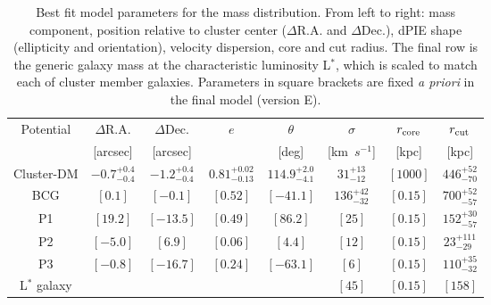 \documentclass[12pt]{article}
\begin{document}
{\begin{table}[ht]
    \centering
    \begin{tabular}{c|c|c|c|c|c|c|c|}
    Potential & $\Delta$R.A. & $\Delta$Dec. & $e$ & $\theta$ & $\sigma$ & $r_{\rm core}$ & $r_{\rm cut}$ \\
    & [arcsec] & [arcsec] & & [deg] & [km\ $s^{-1}$] & [kpc] & [kpc] \\
\hline
Cluster-DM & $ -0.7^{+  0.4}_{ -0.4}$ & $ -1.2^{+  0.4}_{ -0.4}$ & $ 0.81^{+ 0.02}_{-0.13}$ & $114.9^{+  2.0}_{ -4.1}$ & $31^{+13}_{-12}$ & $[1000]$ & $446^{+52}_{-70}$ \\
BCG            & $[  0.1]$ & $[ -0.1]$ & $[0.52]$ & $[-41.1]$ & $136^{+42}_{-32}$ & $[0.15]$ & $700^{+52}_{-57}$ \\
P1             & $[ 19.2]$ & $[-13.5]$ & $[0.49]$ & $[ 86.2]$ & $[25]$            & $[0.15]$ & $152^{+30}_{-57}$ \\
P2             & $[ -5.0]$ & $[  6.9]$ & $[0.06]$ & $[  4.4]$ & $[12]$            & $[0.15]$ & $23^{+111}_{-29}$ \\
P3             & $[ -0.8]$ & $[-16.7]$ & $[0.24]$ & $[-63.1]$ & $[6]$             & $[0.15]$ & $110^{+35}_{-32}$ \\
L$^{*}$ galaxy &           &           &          &           & $[45]$            & $[0.15]$ & $[158]$\\            
\hline
    \end{tabular}
    \caption{Best fit model parameters for the mass distribution. From left to right: mass component, position relative to cluster center ($\Delta$R.A. and $\Delta$Dec.), dPIE shape (ellipticity and orientation), velocity dispersion, core and cut radius. The final row 
    is the generic galaxy mass at the characteristic luminosity L$^*$, which is scaled to match each of cluster member galaxies.  Parameters in square brackets are fixed {\it a priori} in the final model (version E). }
    \label{tab:massmodel}
\end{table}


}
\end{document}

